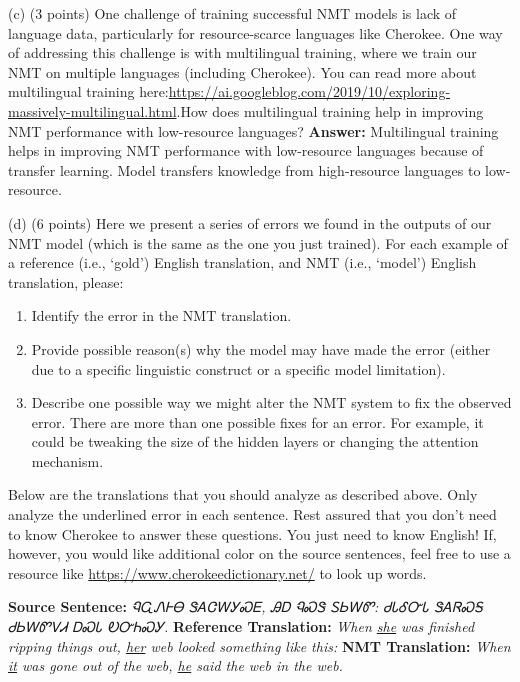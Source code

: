 \documentclass{article}
\begin{document}
	
	\bigbreak
	(c) (3 points) One challenge of training successful NMT models is lack of language data, particularly for resource-scarce languages like Cherokee. One way of addressing this challenge is with multilingual training, where we train our NMT on multiple languages (including Cherokee). You can read more about multilingual training here:\newline \url{https://ai.googleblog.com/2019/10/exploring-massively-multilingual.html}.\newline How does multilingual training  help in improving NMT performance with low-resource languages?
	\smallbreak
	\textbf{Answer:}
	Multilingual training helps in improving NMT performance with low-resource languages because of transfer learning. Model transfers knowledge from high-resource languages to low-resource.
	
	
	\bigbreak
	(d) (6 points) Here we present a series of errors we found in the outputs of our NMT model (which is the same as the one you just trained). For each example of a reference (i.e., `gold') English translation, and NMT (i.e., `model') English translation, please:
	
	\begin{enumerate}
		\item Identify the error in the NMT translation.
		\item Provide possible reason(s) why the model may have made the error (either due to a specific linguistic construct or a specific model limitation).
		\item Describe one possible way we might alter the NMT system to fix the observed error. There are more than one possible fixes for an error. For example, it could be tweaking the size of the hidden layers or changing the attention mechanism.
	\end{enumerate}
	Below are the translations that you should analyze as described above. Only analyze the underlined error in each sentence. Rest assured that you don't need to know Cherokee to answer these questions. You just need to know English! If, however, you would like additional color on the source sentences, feel free to use a resource like \url{https://www.cherokeedictionary.net/} to look up words.
	

	\smallbreak
	\textbf{Source Sentence:} \textit{{\cherokeefam ᏄᏩᏁᎰᎾ ᏕᎪᏣᎳᎩᏍᎬ, ᎯᎠ ᏄᏍᏕ ᏚᏏᎳᏛ: ᏧᏓᎴᏅᏓ ᏕᎪᏒᏍᎦ ᏧᏏᎳᏛᏙᏗ ᎠᏍᏓ ᎧᏅᏂᏍᎩ.        }}\newline
	\textbf{Reference Translation:} \textit{When \underline{she} was finished ripping things out, \underline{her} web looked something like this: }\newline
	\textbf{NMT Translation:} \textit{When \underline{it} was gone out of the web, \underline{he} said the web in the web.}
	
\end{document}
